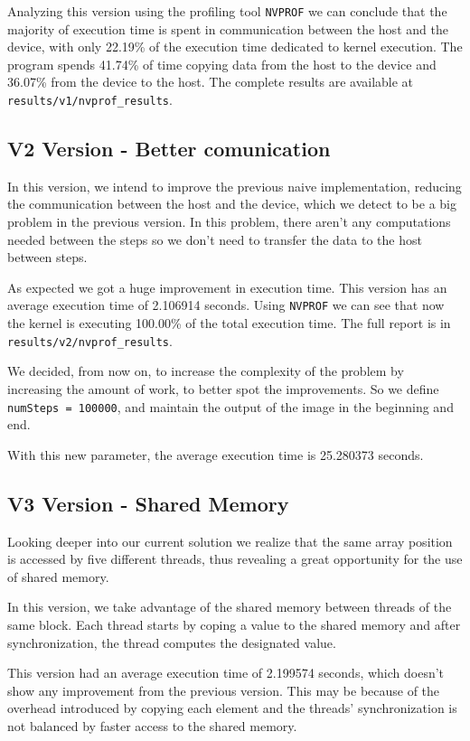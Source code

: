\documentclass[conference]{IEEEtran}
\begin{document}
Analyzing this version using the profiling tool \texttt{NVPROF} we can conclude that the majority of execution time is spent in communication between the host and the device, with only  22.19\% of the execution time dedicated to kernel execution. The program spends 41.74\% of time copying data from the host to the device and 36.07\% from the device to the host. The complete results are available at \texttt{results/v1/nvprof\_results}.

\subsection{V2 Version - Better comunication}
In this version, we intend to improve the previous naive implementation, reducing the communication between the host and the device, which we detect to be a big problem in the previous version. In this problem, there aren't any computations needed between the steps so we don't need to transfer the data to the host between steps.

As expected we got a huge improvement in execution time. This version has an average execution time of 2.106914 seconds. Using \texttt{NVPROF} we can see that now the kernel is executing 100.00\% of the total execution time. The full report is in \texttt{results/v2/nvprof\_results}.

We decided, from now on, to increase the complexity of the problem by increasing the amount of work, to better spot the improvements. So we define \texttt{numSteps = 100000}, and maintain the output of the image in the beginning and end.

With this new parameter, the average execution time is 25.280373 seconds.

\subsection{V3 Version - Shared Memory}
Looking deeper into our current solution we realize that the same array position is accessed by five different threads, thus revealing a great opportunity for the use of shared memory.

In this version, we take advantage of the shared memory between threads of the same block. Each thread starts by coping a value to the shared memory and after synchronization, the thread computes the designated value.

This version had an average execution time of 2.199574 seconds, which doesn't show any improvement from the previous version. This may be because of the overhead introduced by copying each element and the threads' synchronization is not balanced by faster access to the shared memory.
\end{document}

